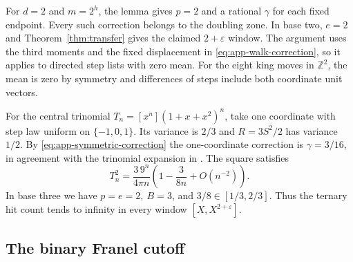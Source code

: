 \documentclass[11pt,reqno,a4paper]{amsart}
\theoremstyle{remark}
\begin{document}
For \(d=2\) and \(m=2^h\), the lemma gives \(p=2\) and a rational
\(\gamma\) for each fixed endpoint. Every such correction belongs to
the doubling zone. In base two, \(e=2\) and Theorem~\ref{thm:transfer}
gives the claimed \(2+\varepsilon\) window. The argument uses the
third moments and the fixed displacement in
\eqref{eq:app-walk-correction}, so it applies to directed step
lists with zero mean. For the eight king moves in \(\mathbb Z^2\),
the mean is zero by symmetry and differences of steps include both
coordinate unit vectors.

For the central trinomial \(T_n=[x^n](1+x+x^2)^n\), take one
coordinate with step law uniform on \(\{-1,0,1\}\). Its variance
is \(2/3\) and \(R=3S^2/2\) has variance \(1/2\). By
\eqref{eq:app-symmetric-correction} the one-coordinate correction is
\(\gamma=3/16\), in agreement with the trinomial expansion in
\cite{app-wagner}. The square satisfies
\begin{equation}\label{eq:app-trinomial}
 T_n^2=\frac{3\,9^n}{4\pi n}
       \left(1-\frac{3}{8n}+O(n^{-2})\right).
\end{equation}
In base three we have \(p=e=2,\ B=3\), and
\(3/8\in[1/3,2/3]\). Thus the ternary hit count tends to infinity
in every window \([X,X^{2+\varepsilon}]\).

\subsection{The binary Franel cutoff}
\end{document}
